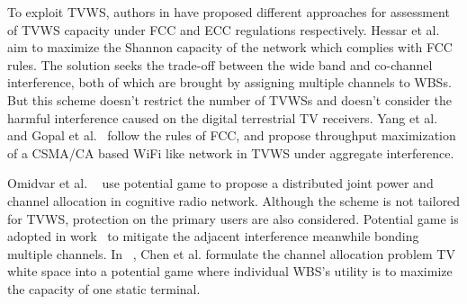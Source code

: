 \documentclass[times]{ettauth}
\newcommand{\ie}{i.e., }
\theoremstyle{mytheoremstyle}
\theoremstyle{mytheoremstyle}
\theoremstyle{mytheoremstyle}
\begin{document}


To exploit TVWS, authors in \cite{DySpAN10MeasuringWhitespaceCapacity, HessarTMC15, Deshmukh2015, Achtzehn12} have proposed different approaches for assessment of TVWS capacity under FCC and ECC regulations respectively.
Hessar et al.~\cite{ReAlloTVWS14DySPAN} aim to maximize the Shannon capacity of the network which complies with FCC rules.
The solution seeks the trade-off between the wide band and co-channel interference, both of which are brought by assigning multiple channels to WBSs.
But this scheme doesn't restrict the number of TVWSs and doesn't consider the harmful interference caused on the digital terrestrial TV receivers.
Yang et al.~\cite{yang2013WiFiWSTVCapacity} and Gopal et al.~\cite{gopalTCCN16} follow the rules of FCC, and propose throughput maximization of a CSMA/CA based WiFi like network in TVWS under aggregate interference.

Omidvar et al. ~\cite{pimrc_2012} use potential game to propose a distributed joint power and channel allocation in cognitive radio network.
Although the scheme is not tailored for TVWS, protection on the primary users are also considered.
Potential game is adopted in work~\cite{Elias17} to mitigate the adjacent interference meanwhile bonding multiple channels.
In ~\cite{spectrum_sharing_tvspace_2012}, Chen et al. formulate the channel allocation problem TV white space into a potential game where individual WBS's utility is to maximize the capacity of one static terminal.
\end{document}
